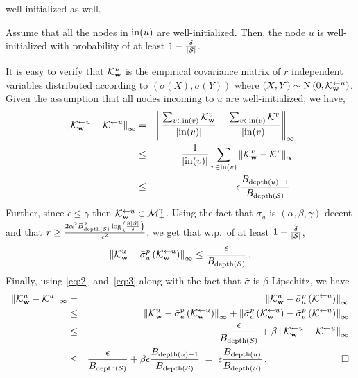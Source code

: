well-initialized as well.
\begin{claim}\label{claim1}
Assume that all the nodes in $\mathrm{in}(u)$ are well-initialized. Then, the node
$u$ is well-initialized with probability of at least $1-\frac{\delta}{|{\cal S}|}$.
\end{claim}
\proof
It is easy to verify that $\mathcal{K}_{\mathbf w}^u$ is the empirical
covariance matrix of $r$ independent variables distributed according to
$\left(\sigma(X),\sigma(Y)\right)$ where
$(X,Y)\sim\text{N}\left(0,\mathcal{K}_{\mathbf w}^{\leftarrow u}\right)$.
Given the assumption that all nodes incoming to $u$ are well-initialized,
we have,
\begin{eqnarray}\label{eq:2}
\left\|\mathcal{K}_{\mathbf w}^{\leftarrow u}-\mathcal{K}^{\leftarrow u}\right\|_\infty
&=&
\left\|
	\frac{\sum_{v\in\mathrm{in}(v)}\mathcal{K}_{\mathbf w}^{v}}{|\mathrm{in}(v)|} -
	\frac{\sum_{v\in\mathrm{in}(v)}\mathcal{K}^{v}}{|\mathrm{in}(v)|}\right\|_\infty\nonumber
\\
&\le& \frac{1}{|\mathrm{in}(v)|}\sum_{v\in\mathrm{in}(v)}
	\left\|\mathcal{K}_{\mathbf w}^{v}-\mathcal{K}^{v}\right\|_\infty
\\
&\le&  \epsilon\frac{B_{\mathrm{depth}(u)-1}}{B_{\mathrm{depth}({\cal S})}}\nonumber \,.
\end{eqnarray}
Further, since $\epsilon\le \gamma$ then
$\mathcal{K}^{\leftarrow u}_{\mathbf w}\in {\cal M}_+^\gamma$. Using the fact
that $\sigma_u$ is
$(\alpha,\beta,\gamma)$-decent and that
$r\ge \frac{2\alpha^2 B^2_{\mathrm{depth}({\cal S})}
	\log\left(\frac{8|{\cal S}|}{\delta}\right)}{\epsilon^2}$,
we get that w.p.\ of at least $1- \frac{\delta}{|{\cal S}|}$,
\begin{equation}\label{eq:3}
\left\|\mathcal{K}^u_{\mathbf w} -
	\bar\sigma^p_u\left(\mathcal{K}_{\mathbf w}^{\leftarrow u}\right)\right\|_\infty
	\le \frac{\epsilon}{B_{\mathrm{depth}({\cal S})}} \,.
\end{equation}
Finally, using \eqref{eq:2}~and~\eqref{eq:3} along with the fact that
$\bar\sigma$ is $\beta$-Lipschitz, we have
\begin{eqnarray*}
\|\mathcal{K}_{\mathbf w}^{u}-\mathcal{K}^{u}\|_\infty &=&
\left\|\mathcal{K}_{\mathbf w}^{u} -
	\bar\sigma^p_u\left(\mathcal{K}^{\leftarrow u}\right)\right\|_\infty
\\
&\le & \left\|\mathcal{K}^u_{\mathbf w} -
	\bar\sigma^p_u\left(\mathcal{K}_{\mathbf w}^{\leftarrow u}\right)\right\|_\infty +
	\left\| \bar\sigma^p_u\left(\mathcal{K}_{\mathbf w}^{\leftarrow u}\right) -
	\bar\sigma^p_u\left(\mathcal{K}^{\leftarrow u}\right)\right\|_\infty
\\
&\le &   \frac{\epsilon}{B_{\mathrm{depth}({\cal S})}} +
\beta\left\| \mathcal{K}_{\mathbf w}^{\leftarrow u} -
	\mathcal{K}^{\leftarrow u}\right\|_\infty
\\
&\le &  \frac{\epsilon}{B_{\mathrm{depth}({\cal S})}} +
\beta \epsilon \frac{B_{\mathrm{depth}(u)-1}}{B_{\mathrm{depth}({\cal S})}}
\;=\;  \epsilon \frac{B_{\mathrm{depth}(u)}}{B_{\mathrm{depth}({\cal S})}} \,. \hspace{2cm} \qed
\end{eqnarray*}

